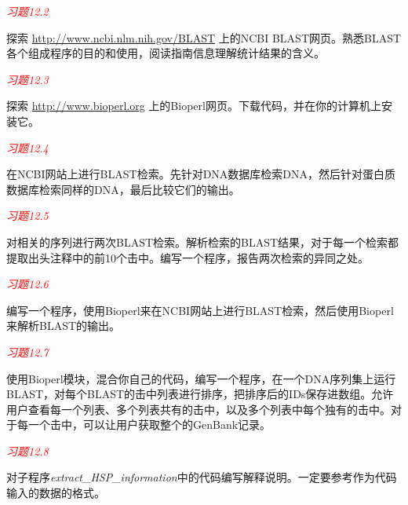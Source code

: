\textcolor{red}{\textit{习题12.2}}
\begin{adjustwidth}{1cm}{}
探索 \href{http://www.ncbi.nlm.nih.gov/BLAST}{http://www.ncbi.nlm.nih.gov/BLAST} 上的NCBI BLAST网页。熟悉BLAST各个组成程序的目的和使用，阅读指南信息理解统计结果的含义。
\end{adjustwidth}

\textcolor{red}{\textit{习题12.3}}
\begin{adjustwidth}{1cm}{}
探索 \href{http://www.bioperl.org}{http://www.bioperl.org} 上的Bioperl网页。下载代码，并在你的计算机上安装它。
\end{adjustwidth}

\textcolor{red}{\textit{习题12.4}}
\begin{adjustwidth}{1cm}{}
在NCBI网站上进行BLAST检索。先针对DNA数据库检索DNA，然后针对蛋白质数据库检索同样的DNA，最后比较它们的输出。
\end{adjustwidth}

\textcolor{red}{\textit{习题12.5}}
\begin{adjustwidth}{1cm}{}
对相关的序列进行两次BLAST检索。解析检索的BLAST结果，对于每一个检索都提取出头注释中的前10个击中。编写一个程序，报告两次检索的异同之处。
\end{adjustwidth}

\textcolor{red}{\textit{习题12.6}}
\begin{adjustwidth}{1cm}{}
编写一个程序，使用Bioperl来在NCBI网站上进行BLAST检索，然后使用Bioperl来解析BLAST的输出。
\end{adjustwidth}

\textcolor{red}{\textit{习题12.7}}
\begin{adjustwidth}{1cm}{}
使用Bioperl模块，混合你自己的代码，编写一个程序，在一个DNA序列集上运行BLAST，对每个BLAST的击中列表进行排序，把排序后的IDs保存进数组。允许用户查看每一个列表、多个列表共有的击中，以及多个列表中每个独有的击中。对于每一个击中，可以让用户获取整个的GenBank记录。
\end{adjustwidth}

\textcolor{red}{\textit{习题12.8}}
\begin{adjustwidth}{1cm}{}
对子程序\textit{extract\_HSP\_information}中的代码编写解释说明。一定要参考作为代码输入的数据的格式。
\end{adjustwidth}

